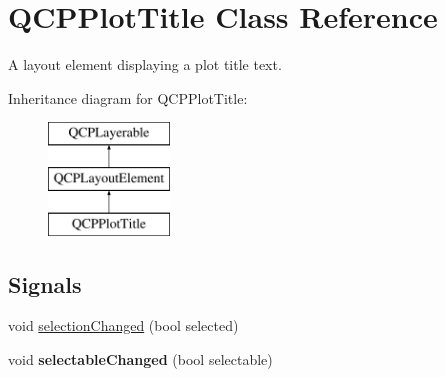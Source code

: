 \hypertarget{classQCPPlotTitle}{\section{\-Q\-C\-P\-Plot\-Title \-Class \-Reference}
\label{classQCPPlotTitle}
}


\-A layout element displaying a plot title text.  


\-Inheritance diagram for \-Q\-C\-P\-Plot\-Title\-:\begin{figure}[H]
\begin{center}
\leavevmode
\includegraphics[height=3.000000cm]{classQCPPlotTitle}
\end{center}
\end{figure}
\subsection*{\-Signals}
\begin{DoxyCompactItemize}
\item 
void \hyperlink{classQCPPlotTitle_a3a01ede2da3b0b5eda33aa5274cc3523}{selection\-Changed} (bool selected)
\item 
\hypertarget{classQCPPlotTitle_a5eac3c17a4dbabb75250bc1210a83cfc}{void {\bfseries selectable\-Changed} (bool selectable)}\label{classQCPPlotTitle_a5eac3c17a4dbabb75250bc1210a83cfc}

\end{DoxyCompactItemize}
